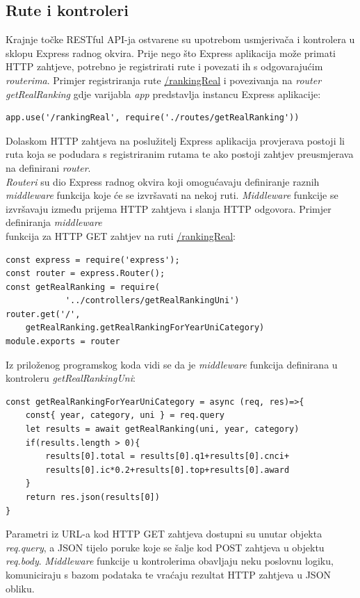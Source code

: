 \documentclass[times, utf8, zavrsni]{fer}
\begin{document}
\subsection{Rute i kontroleri}
Krajnje točke  RESTful API-ja ostvarene su upotrebom usmjerivača  i kontrolera u sklopu Express radnog okvira. 
Prije nego što Express aplikacija može primati HTTP zahtjeve, potrebno je registrirati rute i povezati ih s odgovarajućim \emph{routerima}.
Primjer registriranja rute \url{/rankingReal} i povezivanja na \emph{router} \emph{getRealRanking} gdje varijabla \emph{app} predstavlja instancu Express aplikacije:
\begin{verbatim}  
app.use('/rankingReal', require('./routes/getRealRanking'))
\end{verbatim}
Dolaskom HTTP zahtjeva na poslužitelj Express aplikacija provjerava postoji li ruta koja se podudara s registriranim rutama te ako postoji 
zahtjev preusmjerava na definirani \emph{router}.
\\\emph{Routeri} su dio Express radnog okvira koji omogućavaju definiranje raznih \emph{middleware} funkcija koje će se izvršavati 
na nekoj ruti.
\emph{Middleware} funkcije se izvršavaju između prijema HTTP zahtjeva i slanja HTTP odgovora. Primjer definiranja \emph{middleware}
\\funkcija za HTTP GET zahtjev na ruti \url{/rankingReal}:
\begin{verbatim}  
const express = require('express');
const router = express.Router();
const getRealRanking = require(
            '../controllers/getRealRankingUni')
router.get('/', 
    getRealRanking.getRealRankingForYearUniCategory)
module.exports = router
\end{verbatim}
Iz priloženog programskog koda vidi se da je \emph{middleware} funkcija definirana u kontroleru \emph{getRealRankingUni}:
\begin{verbatim}  
const getRealRankingForYearUniCategory = async (req, res)=>{
    const{ year, category, uni } = req.query
    let results = await getRealRanking(uni, year, category)
    if(results.length > 0){
        results[0].total = results[0].q1+results[0].cnci+
        results[0].ic*0.2+results[0].top+results[0].award
    }
    return res.json(results[0])
}
\end{verbatim}
Parametri iz URL-a kod HTTP GET zahtjeva dostupni su unutar objekta \emph{req.query}, a JSON tijelo poruke koje se šalje kod POST zahtjeva u objektu \emph{req.body}.
\emph{Middleware} funkcije u kontrolerima obavljaju neku poslovnu logiku, komuniciraju s bazom podataka te vraćaju rezultat HTTP zahtjeva u JSON obliku.
\end{document}
